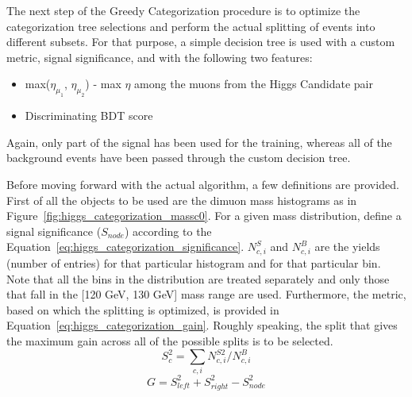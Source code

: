 The next step of the Greedy Categorization procedure is to optimize the categorization tree selections and perform the actual splitting of events into different subsets. For that purpose, a simple decision tree is used with a custom metric, signal significance, and with the following two features:
\begin{itemize}
  \item max($\eta_{\mu_1}$, $\eta_{\mu_2}$) - max $\eta$ among the muons from the Higgs Candidate pair
  \item Discriminating BDT score
\end{itemize}
Again, only part of the signal has been used for the training, whereas all of the background events have been passed through the custom decision tree.

Before moving forward with the actual algorithm, a few definitions are provided. First of all the objects to be used are the dimuon mass histograms as in Figure~\ref{fig:higgs_categorization_massc0}. For a given mass distribution, define a signal significance ($S_{node}$) according to the Equation~\ref{eq:higgs_categorization_significance}. $N^{S}_{c,i}$ and $N^{B}_{c,i}$ are the yields (number of entries) for that particular histogram and for that particular bin. Note that all the bins in the distribution are treated separately and only those that fall in the [120 GeV, 130 GeV] mass range are used. Furthermore, the metric, based on which the splitting is optimized, is provided in Equation~\ref{eq:higgs_categorization_gain}. Roughly speaking, the split that gives the maximum gain across all of the possible splits is to be selected.
\begin{equation}
  {S^2_c} = \sum_{c,i}N^{S2}_{c,i}/N^{B}_{c,i}
  \label{eq:higgs_categorization_significance}
\end{equation}
\begin{equation}
  {G} = {S^2_{left}} + {S^2_{right}} - {S^2_{node}}
  \label{eq:higgs_categorization_gain}
\end{equation}
